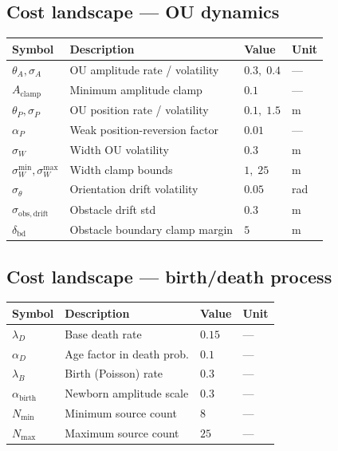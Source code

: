 \documentclass[11pt,a4paper]{article}
\begin{document}
\subsection*{Cost landscape --- OU dynamics}

\begin{center}
\begin{tabular}{llll}
\toprule
Symbol & Description & Value & Unit \\
\midrule
$\theta_A, \sigma_A$          & OU amplitude rate / volatility & $0.3,\;0.4$   & --- \\
$A_{\mathrm{clamp}}$          & Minimum amplitude clamp        & $0.1$         & --- \\
$\theta_P, \sigma_P$          & OU position rate / volatility  & $0.1,\;1.5$   & m \\
$\alpha_P$                    & Weak position-reversion factor & $0.01$        & --- \\
$\sigma_W$                    & Width OU volatility            & $0.3$         & m \\
$\sigma_W^{\min}, \sigma_W^{\max}$ & Width clamp bounds        & $1,\;25$      & m \\
$\sigma_\theta$               & Orientation drift volatility   & $0.05$        & rad \\
$\sigma_{\mathrm{obs,drift}}$ & Obstacle drift std             & $0.3$         & m \\
$\delta_{\mathrm{bd}}$        & Obstacle boundary clamp margin & $5$           & m \\
\bottomrule
\end{tabular}
\end{center}

\subsection*{Cost landscape --- birth/death process}

\begin{center}
\begin{tabular}{llll}
\toprule
Symbol & Description & Value & Unit \\
\midrule
$\lambda_D$               & Base death rate            & $0.15$  & --- \\
$\alpha_D$                & Age factor in death prob.  & $0.1$   & --- \\
$\lambda_B$               & Birth (Poisson) rate       & $0.3$   & --- \\
$\alpha_{\mathrm{birth}}$ & Newborn amplitude scale    & $0.3$   & --- \\
$N_{\min}$                & Minimum source count       & $8$     & --- \\
$N_{\max}$                & Maximum source count       & $25$    & --- \\
\bottomrule
\end{tabular}
\end{center}
\end{document}
